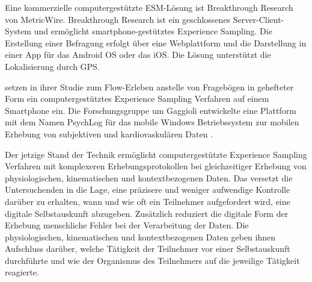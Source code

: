 Eine kommerzielle computergestützte \ac{ESM}-Lösung ist Breakthrough Research von MetricWire. Breakthrough Research ist ein geschlossenes Server-Client-System und ermöglicht smartphone-gestütztes Experience Sampling. Die Erstellung einer Befragung erfolgt über eine Webplattform und die Darstellung in einer App für das Android OS oder das iOS. Die Lösung unterstützt die Lokalisierung durch \acs{GPS}.

\citet{Gaggioli2013} setzen in ihrer Studie zum Flow-Erleben anstelle von Fragebögen in gehefteter Form ein computergestütztes Experience Sampling Verfahren auf einem Smartphone ein. Die Forschungsgruppe um Gaggioli entwickelte eine Plattform mit dem Namen PsychLog für das mobile Windows Betriebssystem zur mobilen Erhebung von subjektiven und kardiovaskulären Daten \citep{Gaggioli2013a}.

Der jetzige Stand der Technik ermöglicht computergestützte Experience Sampling Verfahren mit komplexeren Erhebungsprotokollen bei gleichzeitiger Erhebung von physiologischen, kinematischen und kontextbezogenen Daten. Das versetzt die Untersuchenden in die Lage, eine präzisere und weniger aufwendige Kontrolle darüber zu erhalten, wann und wie oft ein Teilnehmer aufgefordert wird, eine digitale Selbstauskunft abzugeben. Zusätzlich reduziert die digitale Form der Erhebung menschliche Fehler bei der Verarbeitung der Daten. Die physiologischen, kinematischen und kontextbezogenen Daten geben ihnen Aufschluss darüber, welche Tätigkeit der Teilnehmer vor einer Selbstauskunft durchführte und wie der Organismus des Teilnehmers auf die jeweilige Tätigkeit reagierte.

